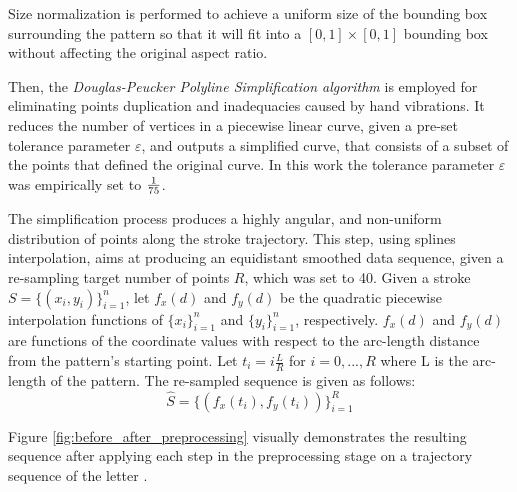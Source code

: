 \documentclass[10pt, conference, compsocconf]{IEEEtran}
\begin{document}
Size normalization is performed to achieve a uniform size of the bounding box surrounding the pattern so that it will fit into a $[0,1]\times[0,1]$ bounding box without affecting the original aspect ratio. 

Then, the \emph{Douglas-Peucker Polyline Simplification algorithm} \cite{douglas1973algorithms} is employed for eliminating points duplication and inadequacies caused by hand vibrations. 
It reduces the number of vertices in a piecewise linear curve, given a pre-set tolerance parameter $\varepsilon$, and outputs a simplified curve, that consists of a subset of the points that defined the original curve.
In this work the tolerance parameter $\varepsilon$ was empirically set to ${1 \over 75}$.

The simplification process produces a highly angular, and non-uniform distribution of points along the stroke trajectory.
This step, using splines interpolation, aims at producing an equidistant smoothed data sequence, given a re-sampling target number of points $R$, which was set to 40. 
Given a stroke $S=\{(x_i,y_i)\}_{i=1}^{n}$, let $f_{x}(d)$ and $f_{y}(d)$ be the quadratic piecewise interpolation functions of $\{x_i\}_{i=1}^{n}$ and $\{y_i\}_{i=1}^{n}$, respectively. 
$f_{x}(d)$ and $f_{y}(d)$ are functions of the coordinate values with respect to the arc-length distance from the pattern's starting point. 
Let $t_i=i\frac{L}{R}$ for $i=0,...,R$ where L is the arc-length of the pattern.
The re-sampled sequence is given as follows:
\begin{equation}
\widehat{S}=\{(f_x(t_i),f_y(t_i))\}_{i=1}^{R}
\end{equation}

Figure \ref{fig:before_after_preprocessing} visually demonstrates the resulting sequence after applying each step in the preprocessing stage on a trajectory sequence of the letter . 
\end{document}
